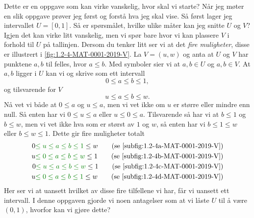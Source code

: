 \documentclass[a4paper,11pt]{article}
\begin{document}
\begin{solution}
  Dette er en oppgave som kan virke vanskelig, hvor skal vi starte? Når jeg
  møter en slik oppgave prøver jeg først og forstå hva jeg skal vise. Så først
  lager jeg intervallet $U = [0,1]$. Så er spørsmålet, hvilke ulike måter kan
  jeg snitte $U$ og $V$?  Igjen det kan virke litt vanskelig, men vi spør bare
  hvor vi kan plassere $V$ i forhold til $U$ på tallinjen. Dersom du tenker litt
  ser vi at det \emph{fire muligheter}, disse er illustrert i
  \cref{fig:1.2-4-MAT-0001-2019-V}. La $V = (u,w)$ og anta at $U$ og $V$ har
  punktene $a,b$ til felles, hvor $a \leq b$. Med symboler sier vi at $a,b \in
  U$ og $a,b \in V$. At $a,b$ ligger i $U$ kan vi og skrive som ett intervall
  \begin{equation*}
    0 \leq a \leq b \leq 1,
  \end{equation*}
  og tilsvarende for $V$
  \begin{equation*}
    u \leq a \leq b \leq w.
  \end{equation*}
  Nå vet vi både at $0 \leq a$ og $u \leq a$, men vi vet ikke om $u$ er større
  eller mindre enn null. Så enten har vi $0 \leq u \leq a$ eller $u \leq 0 \leq
  a$.  Tilsvarende så har vi at $b \leq 1$ og $b \leq w$, men vi vet ikke hva
  som er størst av $1$ og $w$, så enten har vi $b \leq 1 \leq w$ eller $b \leq w
  \leq 1$. Dette gir fire muligheter totalt
  \begin{align*}
    0 \UiTcorrectColor{\leq u \leq a \leq b \leq 1}{} \leq w \qquad \text{(se \cref{subfig:1.2-4a-MAT-0001-2019-V})}\\
    u \UiTcorrectColor{\leq 0 \leq a \leq b \leq w}{} \leq 1 \qquad \text{(se \cref{subfig:1.2-4b-MAT-0001-2019-V})}\\
    0 \UiTcorrectColor{\leq u \leq a \leq b \leq w}{} \leq 1 \qquad \text{(se \cref{subfig:1.2-4c-MAT-0001-2019-V})}\\
    u \UiTcorrectColor{\leq 0 \leq a \leq b \leq 1}{} \leq w \qquad \text{(se \cref{subfig:1.2-4d-MAT-0001-2019-V})}
  \end{align*}
  Her ser vi at uansett hvilket av disse fire tilfellene vi har, får vi uansett
  ett intervall.  I denne oppgaven gjorde vi noen antagelser som at vi låste $U$
  til å være $(0,1)$, hvorfor kan vi gjøre dette?
\end{solution}

\newpageLF


\end{document}
